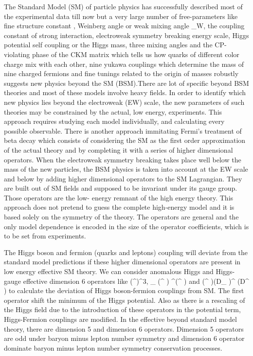 \documentclass[final,3p]{CSP}
\begin{document}
The Standard Model (SM) of particle physics has successfully described most of the experimental data till now but a very large number of
free-parameters like fine structure constant \alpha, Weinberg angle or weak mixing angle \theta_W, the coupling constant of strong 
interaction, electroweak symmetry breaking energy scale, Higgs potential self coupling or the Higgs mass, three mixing angles and the 
CP-violating phase of the CKM matrix which tells us how quarks of different color charge mix with each other, nine yukawa couplings 
which determine the mass of nine charged fermions and fine tunings related to the origin of masses robustly suggests new physics beyond 
the SM (BSM).There are lot of specific beyond BSM theories and most of these models involve heavy fields. In order to identify which new 
physics lies beyond the electroweak (EW) scale, the new parameters of such theories may be constrained by the actual, low energy, 
experiments. This approach requires studying each model individually, and calculating every possible observable. There is another 
approach immitating Fermi’s treatment of beta decay which consists of considering the SM as the first order approximation of the actual 
theory and by completing it with a series of higher dimensional operators. When the electroweak symmetry breaking takes place well below 
the mass of the new particles, the BSM physics is taken into account at the EW scale and below by adding higher dimensional operators to 
the SM Lagrangian. They are built out of SM fields and supposed to be invariant under its gauge group. Those operators are the low-
energy remnant of the high energy theory. This approach does not pretend to guess the complete high-energy model and it is based solely 
on the symmetry of the  theory. The operators are general and the only model dependence is encoded in the size of the operator 
coefficients, which is to be set from experiments. 

The Higgs boson and fermion (quarks and leptons) coupling will deviate from the standard model predictions if these higher dimensional 
operators are present in low energy effective SM theory. We can consider anomalous Higgs and Higgs-gauge effective dimension 6 operators like (\phi^{\dagger}\phi)^3,  \partial_{\mu} (\phi^{\dagger} \phi) \partial^{\mu}(\phi^{\dagger} \phi) and 
(\phi^{\dagger} \phi)(D_{\mu} \phi)^{\dagger} (D^{\mu} \phi) to calculate the deviation of Higgs boson-fermion couplings from SM. The first operator shift the minimum of the Higgs potential. Also as there is a rescaling of the Higgs field due to the introduction of these operators in the potential term, Higgs-Fermion couplings are modified. In the effective beyond standard model theory, there are dimension 5 and dimension 6 operators. Dimension 5 operators are odd under baryon minus lepton number symmetry and dimension 6 operator dominate baryon minus lepton number symmetry conservation processes. 
\end{document}
